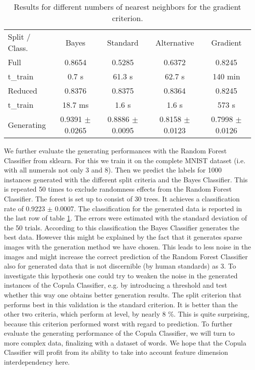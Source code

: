 \documentclass[draft]{article}
\begin{document}
\begin{table}[h]
	\centering
	\begin{tabular}{l c c c c}
		Split / Class.&	Bayes 	& Standard	& Alternative 	& Gradient	\\
		Full		&	0.8654	&	0.5285	&	0.6372		& 0.8245	\\
	 	t\_train	&   0.7 s	&	61.3 s	&	62.7 s		& 140 min	\\
		Reduced 	& 	0.8376	&	0.8375	&	0.8364		& 0.8245	\\
		t\_train	&   18.7 ms	&	1.6 s	&   1.6 s		& 573 s		\\
   		Generating	& 	0.9391 $\pm$ 0.0265	&	0.8886 $\pm$ 0.0095		& 0.8158 $\pm$ 0.0123 & 0.7998 $\pm$ 0.0126 \\
	\end{tabular}
	\caption{Results for different numbers of nearest neighbors for the gradient criterion.}
	\label{tab5}
\end{table}

We further evaluate the generating performances with the Random Forest Classifier from sklearn.
For this we train it on the complete MNIST dataset (i.e. with all numerals not only 3 and 8).
Then we predict the labels for 1000 instances generated with the different split criteria and 
the Bayes Classifier. This is repeated 50 times to exclude randomness effects from the Random Forest Classifier.
The forest is set up to consist of 30 trees.
It achieves a classification rate of 0.9223 $\pm$ 0.0007.
The classification for the generated data is reported in the last row of table \ref{tab5}. 
The errors were estimated with the standard deviation of the 50 trials.
\newline
According to this classification the Bayes Classifier generates the best data. However this might
be explained by the fact that it generates sparse images with the generation method we have chosen.
This leads to less noise in the images and might increase the correct prediction of the Random Forest Classifier 
also for generated data that is not discernible (by human standards) as 3.
To investigate this hypothesis one could try to weaken the noise in the generated instances of the Copula Classifier,
e.g. by introducing a threshold and test whether this way one obtains better generation results.
\newline
The split criterion that performs best in this validation is the standard criterion.
It is better than the other two criteria, which perform at level, by nearly 8 \%.
This is quite surprising, because this criterion performed worst with regard to prediction.
\newline
To further evaluate the generating performance of the Copula Classifier, we will turn to more complex data,
finalizing with a dataset of words. We hope that the Copula Classifier will profit from its ability to take into 
account feature dimension interdependency here.
\end{document}
